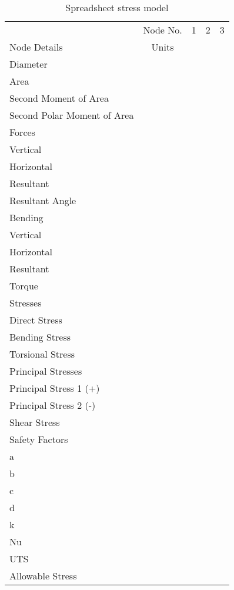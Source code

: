 \begin{table}[h!]
  \caption{Spreadsheet stress model}
  \centering
  \small
  \begin{tabular}{l | c | c c c}
    \toprule
      & Node No. & 1 & 2 & 3\\
    Node Details & Units & \\
    \midrule
    Diameter \\
    Area \\
    Second Moment of Area \\
    Second Polar Moment of Area \\
    \midrule
    Forces \\
    \midrule
    Vertical \\
    Horizontal \\
    Resultant \\
    Resultant Angle \\
    \midrule
    Bending \\
    \midrule
    Vertical \\
    Horizontal \\
    Resultant \\
    Torque \\
    \midrule
    Stresses \\
    \midrule
    Direct Stress \\
    Bending Stress \\
    Torsional Stress \\
    \midrule
    Principal Stresses \\
    \midrule
    Principal Stress 1 (+) \\
    Principal Stress 2 (-) \\
    Shear Stress \\
    \midrule
    Safety Factors \\
    \midrule
    a \\
    b \\
    c \\
    d \\
    k \\
    Nu \\
    \midrule
    UTS \\
    Allowable Stress \\
    \bottomrule
  \end{tabular}
\end{table}
